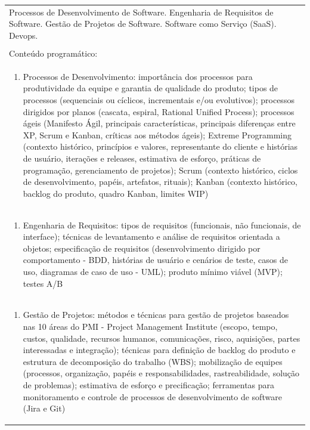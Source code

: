 \documentclass[11pt]{article}
\begin{document}
\begin{center}
\begin{longtable}{|p{4cm}|p{4cm}|p{4cm}|p{4cm}|}
\multicolumn{4}{|p{\dimexpr 16cm + 6\tabcolsep\relax}|}{Processos de Desenvolvimento de Software. Engenharia de Requisitos de Software. Gestão de Projetos de Software. Software como Serviço (SaaS). Devops.}\\
\multicolumn{4}{|p{16cm}|}{}\\
\hline
\multicolumn{4}{|p{16cm}|}{Conteúdo programático:}\\*
\multicolumn{4}{|p{\dimexpr 16cm + 6\tabcolsep\relax}|}{\begin{enumerate}[start=1]\item Processos de Desenvolvimento: importância dos processos para produtividade da equipe e garantia de qualidade do produto; tipos de processos (sequenciais ou cíclicos, incrementais e/ou evolutivos); processos dirigidos por planos (cascata, espiral, Rational Unified Process); processos ágeis (Manifesto Ágil, principais características, principais diferenças entre XP, Scrum e Kanban, críticas aos métodos ágeis); Extreme Programming (contexto histórico, princípios e valores, representante do cliente e histórias de usuário, iterações e releases, estimativa de esforço, práticas de programação, gerenciamento de projetos); Scrum (contexto histórico, ciclos de desenvolvimento, papéis, artefatos, rituais); Kanban (contexto histórico, backlog do produto, quadro Kanban, limites WIP)\end{enumerate}}\\
\multicolumn{4}{|p{\dimexpr 16cm + 6\tabcolsep\relax}|}{\begin{enumerate}[start=2]\item Engenharia de Requisitos: tipos de requisitos (funcionais, não funcionais, de interface); técnicas de levantamento e análise de requisitos orientada a objetos; especificação de requisitos (desenvolvimento dirigido por comportamento - BDD, histórias de usuário e cenários de teste, casos de uso, diagramas de caso de uso - UML); produto mínimo viável (MVP); testes A/B\end{enumerate}}\\
\multicolumn{4}{|p{\dimexpr 16cm + 6\tabcolsep\relax}|}{\begin{enumerate}[start=3]\item Gestão de Projetos: métodos e técnicas para gestão de projetos baseados nas 10 áreas do PMI - Project Management Institute (escopo, tempo, custos, qualidade, recursos humanos, comunicações, risco, aquisições, partes interessadas e integração); técnicas para definição de backlog do produto e estrutura de decomposição do trabalho (WBS); mobilização de equipes (processos, organização, papéis e responsabilidades, rastreabilidade, solução de problemas); estimativa de esforço e precificação; ferramentas para monitoramento e controle de processos de desenvolvimento de software (Jira e Git)\end{enumerate}}\\

\end{longtable}
\end{center}
\end{document}
